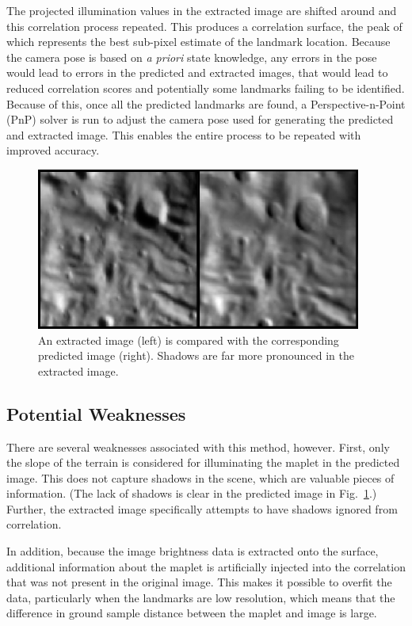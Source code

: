 \documentclass{src/RPI-SIW}
\begin{document}
The projected illumination values in the extracted image are shifted around and this correlation process repeated.  This produces a correlation surface, the peak of which represents the best sub-pixel estimate of the landmark location.  Because the camera pose is based on \textit{a priori} state knowledge, any errors in the pose would lead to errors in the predicted and extracted images, that would lead to reduced correlation scores and potentially some landmarks failing to be identified.  Because of this, once all the predicted landmarks are found, a Perspective-n-Point (PnP) solver is run to adjust the camera pose used for generating the predicted and extracted image.  This enables the entire process to be repeated with improved accuracy.\cite{opnav_near_sb}

\begin{figure}[h]
	\centering
	\includegraphics[width=\columnwidth]{spc_sample.png}
	\caption{An extracted image (left) is compared with the corresponding predicted image (right).  Shadows are far more pronounced in the extracted image.}
	\label{figs::sample}
\end{figure}

\subsection*{Potential Weaknesses}
There are several weaknesses associated with this method, however.  First, only the slope of the terrain is considered for illuminating the maplet in the predicted image.  This does not capture shadows in the scene, which are valuable pieces of information.  (The lack of shadows is clear in the predicted image in Fig.~\ref{figs::sample}.)  Further, the extracted image specifically attempts to have shadows ignored from correlation.

In addition, because the image brightness data is extracted onto the surface, additional information about the maplet is artificially injected into the correlation that was not present in the original image.  This makes it possible to overfit the data, particularly when the landmarks are low resolution, which means that the difference in ground sample distance between the maplet and image is large.
\end{document}
